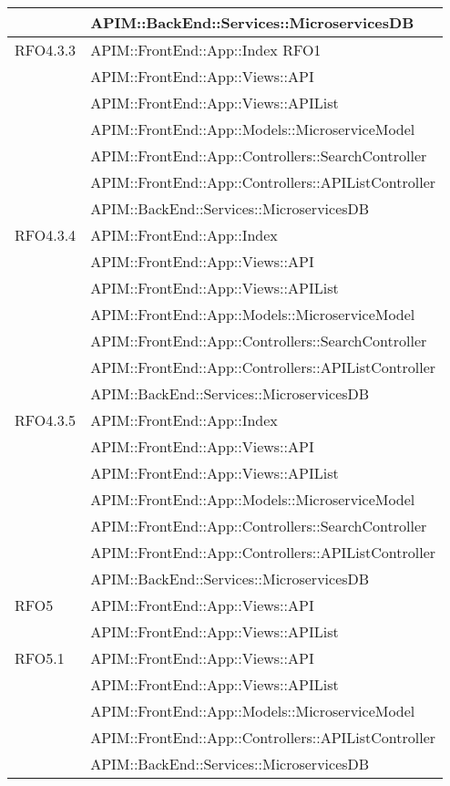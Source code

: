 \begin{longtable}{ p{4cm} | p{12cm} }
	& APIM::BackEnd::Services::MicroservicesDB \\
	\hline
	RFO4.3.3
	& APIM::FrontEnd::App::Index RFO1 \\
	& APIM::FrontEnd::App::Views::API \\
	& APIM::FrontEnd::App::Views::APIList \\
	& APIM::FrontEnd::App::Models::MicroserviceModel \\
	& APIM::FrontEnd::App::Controllers::SearchController \\
	& APIM::FrontEnd::App::Controllers::APIListController \\
	& APIM::BackEnd::Services::MicroservicesDB \\
	\hline		
	RFO4.3.4
	& APIM::FrontEnd::App::Index \\
	& APIM::FrontEnd::App::Views::API \\
	& APIM::FrontEnd::App::Views::APIList \\
	& APIM::FrontEnd::App::Models::MicroserviceModel \\
	& APIM::FrontEnd::App::Controllers::SearchController \\
	& APIM::FrontEnd::App::Controllers::APIListController \\
	& APIM::BackEnd::Services::MicroservicesDB \\
	\hline		
	RFO4.3.5
	& APIM::FrontEnd::App::Index \\
	& APIM::FrontEnd::App::Views::API \\
	& APIM::FrontEnd::App::Views::APIList \\
	& APIM::FrontEnd::App::Models::MicroserviceModel \\
	& APIM::FrontEnd::App::Controllers::SearchController \\
	& APIM::FrontEnd::App::Controllers::APIListController \\
	& APIM::BackEnd::Services::MicroservicesDB \\
	\hline		
	RFO5
	& APIM::FrontEnd::App::Views::API \\
	& APIM::FrontEnd::App::Views::APIList \\
	\hline		
	RFO5.1
	& APIM::FrontEnd::App::Views::API \\
	& APIM::FrontEnd::App::Views::APIList \\
	& APIM::FrontEnd::App::Models::MicroserviceModel \\
	& APIM::FrontEnd::App::Controllers::APIListController \\
	& APIM::BackEnd::Services::MicroservicesDB \\

\end{longtable}
